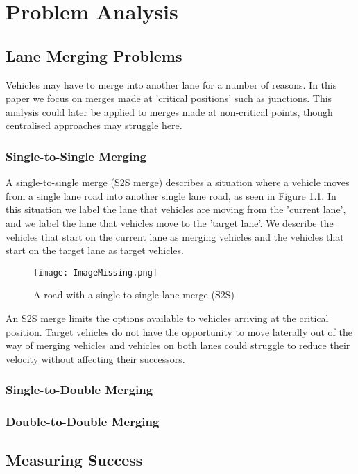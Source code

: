 \chapter{Problem Analysis}
\label{cha:Problem Analysis}

\section{Lane Merging Problems}
\label{sec:Lane Merging Problems}
Vehicles may have to merge into another lane for a number of reasons. In this paper we focus on merges made at 'critical positions' such as junctions. This analysis could later be applied to merges made at non-critical points, though centralised approaches may struggle here.

\subsection{Single-to-Single Merging}
\label{subsec:Single-to-Single Merging}
A single-to-single merge (S2S merge) describes a situation where a vehicle moves from a single lane road into another single lane road, as seen in Figure \ref{fig:S2SMerge}. In this situation we label the lane that vehicles are moving from the 'current lane', and we label the lane that vehicles move to the 'target lane'. We describe the vehicles that start on the current lane as merging vehicles and the vehicles that start on the target lane as target vehicles.

\begin{figure}[htb]
\texttt{[image: ImageMissing.png]}
\caption{A road with a single-to-single lane merge (S2S)}
\label{fig:S2SMerge}
\end{figure}

An S2S merge limits the options available to vehicles arriving at the critical position. Target vehicles do not have the opportunity to move laterally out of the way of merging vehicles and vehicles on both lanes could struggle to reduce their velocity without affecting their successors.

\subsection{Single-to-Double Merging}
\label{subsec:Single-to-Double Merging}

\subsection{Double-to-Double Merging}
\label{subsec:Double-to-Double Merging}

\section{Measuring Success}
\label{sec:Measuring Success}